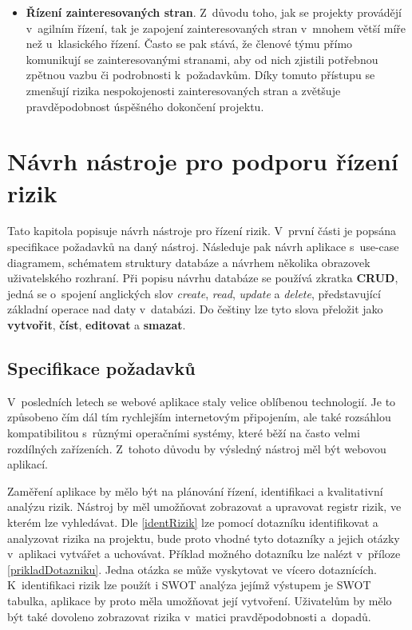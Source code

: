 \begin{itemize}
    \item \textbf{Řízení zainteresovaných stran}. Z~důvodu toho, jak se projekty provádějí v~agilním řízení, tak je zapojení zainteresovaných stran v~mnohem větší míře než u~klasického řízení. Často se pak stává, že členové týmu přímo komunikují se zainteresovanými stranami, aby od nich zjistili potřebnou zpětnou vazbu či podrobnosti k~požadavkům. Díky tomuto přístupu se zmenšují rizika nespokojenosti zainteresovaných stran a zvětšuje pravděpodobnost úspěšného dokončení projektu. 
\end{itemize}


\chapter{Návrh nástroje pro podporu řízení rizik}
\label{navrh}

Tato kapitola popisuje návrh nástroje pro řízení rizik. V~první části je popsána specifikace požadavků na daný nástroj. Následuje pak návrh aplikace s~use-case diagramem, schématem struktury databáze a návrhem několika obrazovek uživatelského rozhraní. Při popisu návrhu databáze se používá zkratka \textbf{CRUD}, jedná se o~spojení anglických slov \textit{create}, \textit{read}, \textit{update} a \textit{delete}, představující základní operace nad daty v~databázi. Do češtiny lze tyto slova přeložit jako \textbf{vytvořit}, \textbf{číst}, \textbf{editovat} a \textbf{smazat}.

\section{Specifikace požadavků}

V~posledních letech se webové aplikace staly velice oblíbenou technologií. Je to způsobeno čím dál tím rychlejším internetovým připojením, ale také rozsáhlou kompatibilitou s~různými operačními systémy, které běží na často velmi rozdílných zařízeních. Z~tohoto důvodu by výsledný nástroj měl být webovou aplikací. 

Zaměření aplikace by mělo být na plánování řízení, identifikaci a kvalitativní analýzu rizik. Nástroj by měl umožňovat zobrazovat a upravovat registr rizik, ve kterém lze vyhledávat. Dle \ref{identRizik} lze pomocí dotazníku identifikovat a analyzovat rizika na projektu, bude proto vhodné tyto dotazníky a jejich otázky v~aplikaci vytvářet a uchovávat. Příklad možného dotazníku lze nalézt v~příloze \ref{prikladDotazniku}. Jedna otázka se může vyskytovat ve vícero dotaznících. K~identifikaci rizik lze použít i SWOT analýza jejímž výstupem je SWOT tabulka, aplikace by proto měla umožňovat její vytvoření. Uživatelům by mělo být také dovoleno zobrazovat rizika v~matici pravděpodobnosti a~dopadů. 

